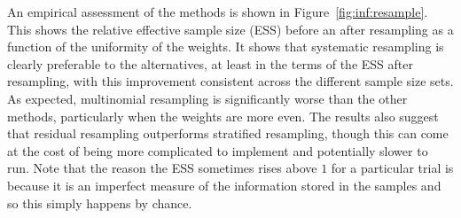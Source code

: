 An empirical assessment of the methods is shown in Figure~\ref{fig:inf:resample}.  This shows
the relative effective sample size (ESS) before an after resampling as a function of the uniformity of
the weights.  It shows that systematic resampling is clearly preferable to the alternatives, at least
in the terms of the ESS after resampling, with this improvement consistent across the different
sample size sets.  As expected, multinomial resampling is significantly worse than the other
methods, particularly when the weights are more even.  The results also suggest that residual
resampling outperforms stratified resampling, though this can come at the cost of being more
complicated to implement and potentially slower to run.  Note that the reason the ESS sometimes
rises above $1$ for a particular trial is because it is an imperfect measure of the information 
stored in the samples and so this simply happens by chance.